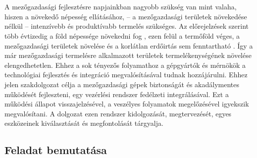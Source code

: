 \chapter{\bevezetes}

A mezőgazdasági fejlesztésre napjainkban nagyobb szükség van mint valaha, hiszen a növekedő népesség ellátásához, -- a mezőgazdasági területek növekedése nélkül -- intenzívebb és produktívabb termelés szükséges. Az előrejelzések szerint több évtizedig a föld népessége növekedni fog \cite{Lutz2010}, ezen felül a termőföld véges, a mezőgazdasági területek növelése és a korlátlan erdőirtás sem fenntartható \cite{Lawrence2014}. Így a már mezőgazdasági termelésre alkalmazott területek termelékenységének növelése elengedhetetlen. Ehhez a sok tényezős folyamathoz a gépgyártók és mérnökök a technológiai fejlesztés és integráció megvalósításával tudnak hozzájárulni.
Ehhez jelen szakdolgozat célja a mezőgazdasági gépek biztonságát és akadálymentes működését fejleszteni, egy vezérlési rendszer fedélzeti integrálásával. Ezt a működési állapot visszajelzésével, a veszélyes folyamatok megelőzésével igyekszik megvalósítani. A dolgozat ezen rendszer kidolgozását, megtervezését, egyes eszközeinek kiválasztását és megfontolását tárgyalja. 

\section{Feladat bemutatása}

